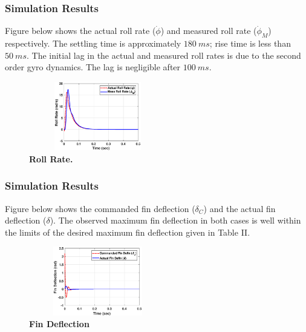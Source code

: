 \documentclass[10pt]{beamer}
\begin{document}
\begin{frame}
\frametitle{Simulation Results}
Figure below shows the actual roll rate ($\dot \phi$) and measured roll rate ($\dot \phi_M$) respectively.  The settling time is approximately $180~ms$; rise time is less than $50~ms$. The initial lag in the actual and measured roll rates is due to the second order gyro dynamics. The lag is negligible after $100~ms$.

\begin{figure}[!h]
\begin{center}
\includegraphics[width=6cm,height=3.0cm]{CascRollAP62.eps}
\vspace{-0.2cm}
\caption{\bf{Roll Rate.}} \label{rollAP12}
\end{center}
\vspace{-0.5cm}
\end{figure}

\end{frame}
\begin{frame}
\frametitle{Simulation Results}
Figure below shows the commanded fin deflection ($\delta_C$) and the actual fin deflection ($\delta$). The observed maximum fin deflection in both cases is well within the limits of the desired maximum fin deflection given in Table II.
%
\begin{figure}[!h]
\begin{center}
\includegraphics[width=6cm,height=3.0cm]{CascRollAP63a.eps}
\vspace{-0.2cm}
\caption{\bf{Fin Deflection}} \label{rollAP11}
\end{center}
\vspace{-0.5cm}
\end{figure}

\end{frame}
\end{document}
